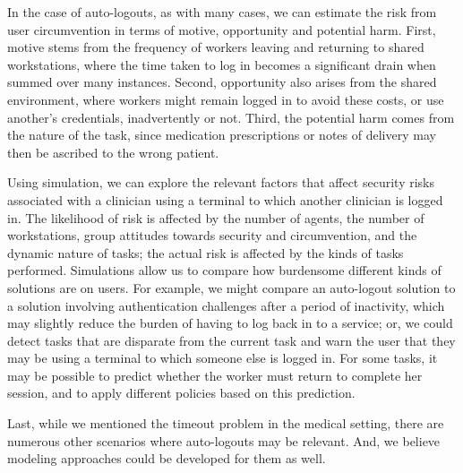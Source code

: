 \documentclass[conference]{IEEEtran}
\begin{document}
{%

In the case of auto-logouts, as with many cases, we can estimate the
risk from user circumvention in terms of motive, opportunity and
potential harm. First, motive stems from the frequency of workers
leaving and returning to shared workstations, where the time taken to
log in becomes a significant drain when summed over many
instances. Second, opportunity also arises from the shared
environment, where workers might remain logged in to avoid these
costs, or use another's credentials, inadvertently or not. Third, the
potential harm comes from the nature of the task, since medication
prescriptions or notes of delivery may then be ascribed to the wrong
patient.

Using simulation, we can explore the relevant factors that 
affect security risks associated with a clinician using a terminal to 
which another clinician is logged in. The likelihood of risk is 
affected by the number of agents, the number of workstations, 
group attitudes towards security and circumvention, and the 
dynamic nature of tasks; the actual risk is affected 
by the kinds of tasks performed. Simulations 
allow us to compare how burdensome different kinds of solutions 
are on users. For example, we might compare an auto-logout 
solution to a solution involving authentication challenges after a 
period of inactivity, which may slightly reduce the burden of 
having to log back in to a service; or, we could detect tasks that 
are disparate from the current task and warn the user that they 
may be using a terminal to which someone else is logged in. 
For some tasks, it may be possible to predict whether 
the worker must return to complete her session, and to apply 
different policies based on this prediction.

Last, while we mentioned the timeout problem in the medical 
setting, there are numerous other scenarios where auto-logouts 
may be relevant. And, we believe modeling approaches could 
be developed for them as well.

}
\end{document}
